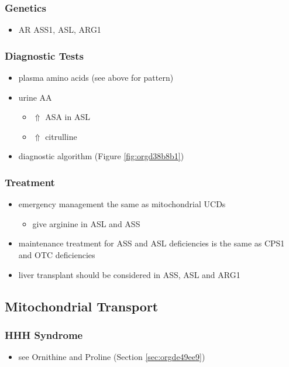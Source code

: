 \documentclass[12pt]{scrartcl}
\begin{document}
\begin{center}
\begin{center}
\subsubsection{Genetics}
\label{sec:org97d21af}
\begin{itemize}
\item AR ASS1, ASL, ARG1
\end{itemize}

\subsubsection{Diagnostic Tests}
\label{sec:org62a2e7f}
\begin{itemize}
\item plasma amino acids (see above for pattern)
\item urine AA
\begin{itemize}
\item \(\Uparrow\) ASA in ASL
\item \(\Uparrow\) citrulline
\end{itemize}
\item diagnostic algorithm (Figure \ref{fig:orgd38b8b1})
\end{itemize}

\subsubsection{Treatment}
\label{sec:orgcf45327}
\begin{itemize}
\item emergency management the same as mitochondrial UCDs
\begin{itemize}
\item give arginine in ASL and ASS
\end{itemize}
\item maintenance treatment for ASS and ASL deficiencies is the same as
CPS1 and OTC deficiencies
\item liver transplant should be considered in ASS, ASL and ARG1
\end{itemize}

\subsection{Mitochondrial Transport}
\label{sec:orgf25e409}
\subsubsection{HHH Syndrome}
\label{sec:org5dbbde1}
\begin{itemize}
\item see Ornithine and Proline (Section \ref{sec:orgde49ee9})
\end{itemize}

\end{center}
\end{center}
\end{document}
